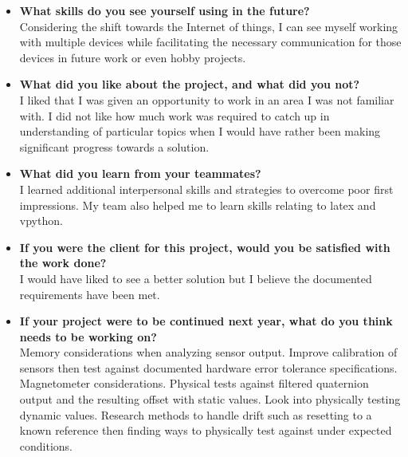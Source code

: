 \begin{itemize}
		\item \textbf{What skills do you see yourself using in the future?}
		\\Considering the shift towards the Internet of things, I can see myself working with multiple devices while facilitating the necessary communication for those devices in future work or even hobby projects.\\

		\item \textbf{What did you like about the project, and what did you not?}
		\\I liked that I was given an opportunity to work in an area I was not familiar with. I did not like how much work was required to catch up in understanding of particular topics when I would have rather been making significant progress towards a solution.\\

		\item \textbf{What did you learn from your teammates?}
		\\I learned additional interpersonal skills and strategies to overcome poor first impressions. My team also helped me to learn skills relating to latex and vpython.\\

		\item \textbf{If you were the client for this project, would you be satisfied with the work done?}
		\\ I would have liked to see a better solution but I believe the documented requirements have been met.\\

		\item \textbf{If your project were to be continued next year, what do you think needs to be working on?}
		\\Memory considerations when analyzing sensor output. Improve calibration of sensors then test against documented hardware error tolerance specifications. Magnetometer considerations. Physical tests against filtered quaternion output and the resulting offset with static values. Look into physically testing dynamic values. Research methods to handle drift such as resetting to a known reference then finding ways to physically test against under expected conditions.\\
	\end{itemize}

\newpage
